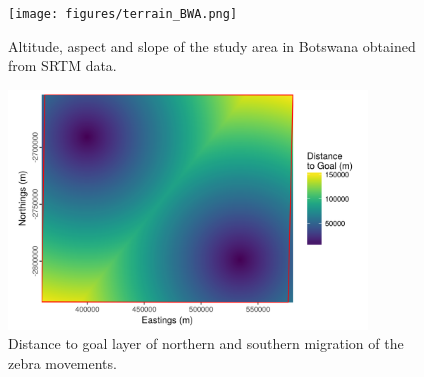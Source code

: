 \documentclass[12pt,a4paper, twoside, english]{article}
\begin{document}
\begin{figure}[H]
  \centering
  \texttt{[image: figures/terrain\_BWA.png]}
  \caption[Altitude, aspect and slope of Ngamiland]{Altitude, aspect and slope of the study area in Botswana obtained from SRTM data.}
  \label{fig:terrain_BWA}
\end{figure}


\begin{figure}[H]
  \centering
  \includegraphics[width=0.85\textwidth]{figures/goal_30m_BWA.png}
  \caption[Migration goal layer]{Distance to goal layer of northern and southern migration of the zebra movements.}
  \label{fig:goal_BWA}
\end{figure}


\end{document}
